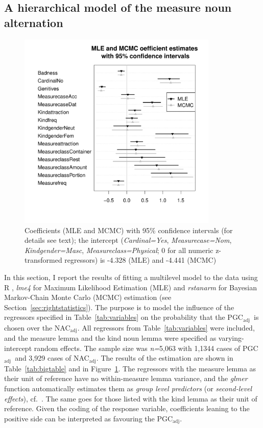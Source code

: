 \documentclass[USenglish]{article}
\newcommand{\Sub}[1]{\ensuremath{\mathrm{_{#1}}}}
\newcommand{\NACa}{NAC\Sub{adj}}
\newcommand{\PGCa}{PGC\Sub{adj}}
\begin{document}
\subsection{A hierarchical model of the measure noun alternation}
\label{sec:corpushierarchicalmodel}

\begin{figure}[hb!]
  \centering
  \includegraphics[width=0.85\textwidth]{../R/output/corpus_fixeffs_mle+mcmc}
  \caption{Coefficients (MLE and MCMC) with 95\% confidence intervals (for details see text); the intercept (\textit{Cardinal=Yes}, \textit{Measurecase=Nom}, \textit{Kindgender=Masc}, \textit{Measureclass=Physical}; 0 for all numeric z-transformed regressors) is -4.328 (MLE) and -4.441 (MCMC)}
  \label{fig:fixeffs}
\end{figure}

In this section, I report the results of fitting a multilevel model to the data using R \citep{R}, \textit{lme4} \citep{lme4} for Maximum Likelihood Estimation (MLE) and \textit{rstanarm} \citep{rstanarm} for Bayesian Markov-Chain Monte Carlo (MCMC) estimation (see Section~\ref{sec:rightstatistics}).
The purpose is to model the influence of the regressors specified in Table~\ref{tab:variables} on the probability that the \PGCa\ is chosen over the \NACa.
All regressors from Table~\ref{tab:variables} were included, and the measure lemma and the kind noun lemma were specified as varying-intercept random effects.
The sample size was \textit{n=}5,063 with 1,1344 cases of \PGCa\ and 3,929 cases of \NACa.
The results of the estimation are shown in Table~\ref{tab:bigtable} and in Figure~\ref{fig:fixeffs}.
The regressors with the measure lemma as their unit of reference have no within-measure lemma variance, and the \textit{glmer} function automatically estimates them as \textit{group level predictors} (or \textit{second-level effects}), cf.\ \citet[265--269,302--304]{GelmanHill2006}.
The same goes for those listed with the kind lemma as their unit of reference.
Given the coding of the response variable, coefficients leaning to the positive side can be interpreted as favouring the \PGCa.
\end{document}
